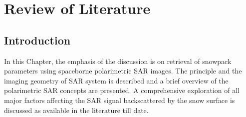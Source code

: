 \chapter{Review of Literature}
\label{sec:2}
\section{Introduction}
In this Chapter, the emphasis of the discussion is on retrieval of snowpack parameters using spaceborne polarimetric SAR images. The principle and the imaging geometry of SAR system is described and a brief overview of the polarimetric SAR concepts are presented. A comprehensive exploration of all major factors affecting the SAR signal backscattered by the snow surface is discussed as available in the literature till date. 